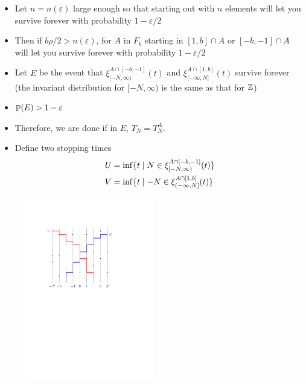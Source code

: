 \documentclass{beamer}
\newcommand{\ep}{\varepsilon}
\newcommand{\ignore}[1]{}
\newcommand{\rb}{\ignore{[}]}
\begin{document}
\begin{frame}
  \begin{itemize}
    \item Let $n = n(\ep)$ large enough so that starting out with $n$ elements will let you survive forever with probability $1 - \ep/2$
          \pause
    \item Then if $b \rho/2 > n(\ep)$, for $A$ in $F_{b}$ starting in $[1,b] \cap A$ or $[-b,-1] \cap A$ will let you survive forever with probability $1 - \ep/2$
          \pause
    \item Let $E$ be the event that $\xi_{[-N,\infty)}^{A\cap[-b,-1]}(t)$ and $\xi_{(-\infty,N]}^{A \cap [1,b]}(t)$ survive forever (the invariant distribution for $[-N,\infty)$ is the same as that for $\mathbb{Z}$)
          \pause
    \item $\Prob(E) > 1 - \ep$
          \pause
    \item Therefore, we are done if in $E$, $T_{N} = T_{N}^{A}$.
  \end{itemize}
\end{frame}

\begin{frame}
  \begin{itemize}
    \item Define two stopping times
    \begin{align*}
      U &= \inf\set{t \st N \in \xi_{[-N,\infty)}^{A \cap [-b,-1]}(t)} \\
      V &= \inf\set{t \st -N \in \xi_{(-\infty,N\rb}^{A \cap [1,b]}(t)}
    \end{align*}
  \end{itemize}
  \pause
  \begin{figure}
    \centering
   \includegraphics[width=0.5\textwidth]{U_V.pdf}
 \end{figure}
\end{frame}
\end{document}
